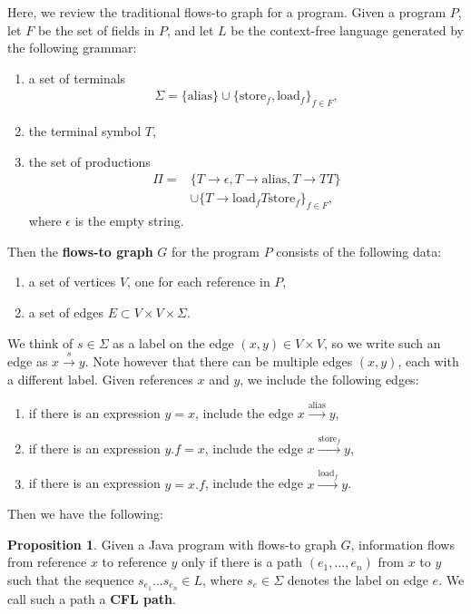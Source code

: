 \documentclass[10pt,twocolumn]{article}
\theoremstyle{definition}
\newtheorem{proposition}[theorem]{Proposition}
\begin{document}
\noindent Here, we review the traditional flows-to graph for a program. Given a program $P$, let $F$ be the set of fields in $P$, and let $L$ be the context-free language generated by the following grammar:
\begin{enumerate}
\item a set of terminals
\begin{align*}
\Sigma=\{\text{alias}\}\cup\{\text{store}_f,\text{load}_f\}_{f\in F},
\end{align*}
\item the terminal symbol $T$,
\item the set of productions
\begin{align*}
\Pi=&\{T\to\epsilon,T\to\text{alias},T\to TT\}\\
&\cup\{T\to\text{load}_fT\text{store}_f\}_{f\in F},
\end{align*}
\noindent where $\epsilon$ is the empty string.
\end{enumerate}
\noindent Then the {\bf flows-to graph} $G$ for the program $P$ consists of the following data:
\begin{enumerate}
\item a set of vertices $V$, one for each reference in $P$,
\item a set of edges $E\subset V\times V\times\Sigma$.
\end{enumerate}
\noindent We think of $s\in\Sigma$ as a label on the edge $(x,y)\in V\times V$, so we write such an edge as $x\xrightarrow{s}y$. Note however that there can be multiple edges $(x,y)$, each with a different label. Given references $x$ and $y$, we include the following edges:
\begin{enumerate}
\item if there is an expression $y=x$, include the edge $x\xrightarrow{\text{alias}}y$,
\item if there is an expression $y.f=x$, include the edge $x\xrightarrow{\text{store}_f}y$,
\item if there is an expression $y=x.f$, include the edge $x\xrightarrow{\text{load}_f}y$.
\end{enumerate}
\noindent Then we have the following:

\begin{proposition}
Given a Java program with flows-to graph $G$, information flows from reference $x$ to reference $y$ only if there is a path $(e_1,...,e_n)$ from $x$ to $y$ such that the sequence $s_{e_1}...s_{e_n}\in L$, where $s_e\in\Sigma$ denotes the label on edge $e$. We call such a path a {\bf CFL path}.
\end{proposition}
\end{document}
